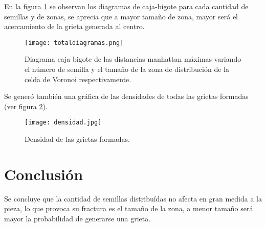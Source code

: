 \documentclass[12pt]{amsart}
\begin{document}
En la figura \ref{fig3} se observan los diagramas de caja-bigote para cada cantidad de semillas y de zonas, se aprecia que a mayor tamaño de zona, mayor será el acercamiento de la grieta generada al centro.
\newpage
\begin{figure}
    \centering
    \texttt{[image: totaldiagramas.png]}
    \caption{Diagrama caja bigote de las distancias manhattan máximas variando el número de semilla y el tamaño de la zona de distribución de la celda de Voronoi respectivamente.}
    \label{fig3}
\end{figure}
Se generó también una gráfica de las densidades de todas las grietas formadas (ver figura \ref{fig4}).
\begin{figure}
    \centering
    \texttt{[image: densidad.jpg]}
    \caption{Densidad de las grietas formadas.}
    \label{fig4}
\end{figure}
\newpage
\section{Conclusión}
Se concluye que la cantidad de semillas distribuídas no afecta en gran medida a la pieza, lo que provoca su fractura es el tamaño de la zona, a menor tamaño será mayor la probabilidad de generarse una grieta.
\bigskip





\bigskip
\end{document}
